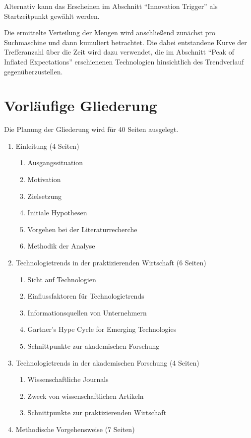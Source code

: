 Alternativ kann das Erscheinen im Abschnitt "`Innovation Trigger"' als Startzeitpunkt gewählt werden.

Die ermittelte Verteilung der Mengen wird anschließend zunächst pro Suchmaschine und dann kumuliert betrachtet. Die dabei entstandene Kurve der Trefferanzahl über die Zeit wird dazu verwendet, die im Abschnitt "`Peak of Inflated Expectations"' erschienenen Technologien hinsichtlich des Trendverlauf gegenüberzustellen.

\section{Vorläufige Gliederung}
Die Planung der Gliederung wird für 40 Seiten ausgelegt.

\begin{enumerate}
	\item Einleitung (4 Seiten)
	\begin{enumerate}
		\item Ausgangssituation
		\item Motivation
		\item Zielsetzung
		\item Initiale Hypothesen
		\item Vorgehen bei der Literaturrecherche
		\item Methodik der Analyse
	\end{enumerate}
	\item Technologietrends in der praktizierenden Wirtschaft (6 Seiten)
	\begin{enumerate}
		\item Sicht auf Technologien
		\item Einflussfaktoren für Technologietrends
		\item Informationsquellen von Unternehmern
		\item Gartner's Hype Cycle for Emerging Technologies
		\item Schnittpunkte zur akademischen Forschung
	\end{enumerate}
	\item Technologietrends in der akademischen Forschung (4 Seiten)
	\begin{enumerate}
		\item Wissenschaftliche Journals
		\item Zweck von wissenschaftlichen Artikeln
		\item Schnittpunkte zur praktizierenden Wirtschaft
	\end{enumerate}
	\item Methodische Vorgehensweise (7 Seiten)

\end{enumerate}
